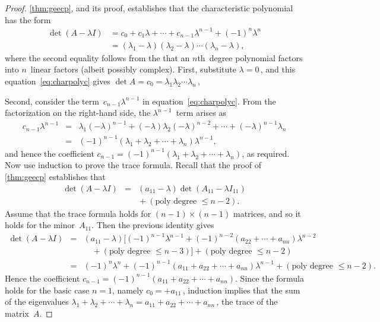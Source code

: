 \begin{proof} 
\cref{thm:geecp}, and its proof, establishes that the characteristic polynomial has the form
\begin{align}
\det(A-\lambda I)&=c_0+c_1\lambda+\cdots+c_{n-1}\lambda^{n-1}+(-1)^n\lambda^n
\nonumber\\&=(\lambda_1-\lambda)(\lambda_2-\lambda)\cdots(\lambda_n-\lambda),
\label{eq:charpolyc}
\end{align}
where the second equality follows from the  that an \(n\)th~degree polynomial factors into \(n\)~linear factors (albeit possibly complex).
First, substitute \(\lambda=0\)\,, and this equation~\eqref{eq:charpolyc} gives \(\det A=c_0=\lambda_1\lambda_2\cdots\lambda_n\)\,, 

Second, consider the term~\(c_{n-1}\lambda^{n-1}\) in equation~\eqref{eq:charpolyc}.
From the factorization on the right-hand side, the \(\lambda^{n-1}\)~term arises as
\begin{eqnarray*}
c_{n-1}\lambda^{n-1}&=&\lambda_1(-\lambda)^{n-1}
+(-\lambda)\lambda_2(-\lambda)^{n-2}
+\cdots+(-\lambda)^{n-1}\lambda_n
\\&=&(-1)^{n-1}(\lambda_1+\lambda_2+\cdots+\lambda_n)\lambda^{n-1},
\end{eqnarray*}
and hence the coefficient \(c_{n-1}=(-1)^{n-1}(\lambda_1+\lambda_2+\cdots+\lambda_n)\), as required.
Now use induction to prove the trace formula.
Recall that the proof of \cref{thm:geecp} establishes that
\begin{eqnarray*}
\det(A-\lambda I)
&=&(a_{11}-\lambda)\det (A_{11}-\lambda I_{11})
\\&&{}
+(\text{poly degree }\leq n-2).
\end{eqnarray*}
Assume that the trace formula holds for \((n-1)\times(n-1)\) matrices, and so it holds for the minor~\(A_{11}\). 
Then the previous identity gives
\begin{eqnarray*}
\det(A-\lambda I)
&=&(a_{11}-\lambda)\big[(-1)^{n-1}\lambda^{n-1}
+(-1)^{n-2}(a_{22}+\cdots+a_{nn})\lambda^{n-2} 
\\&&\quad{}
+(\text{poly degree }\leq n-3)\big]
+(\text{poly degree }\leq n-2)
\\&=&(-1)^{n}\lambda^{n}
+(-1)^{n-1}(a_{11}+a_{22}+\cdots+a_{nn})\lambda^{n-1} 
+(\text{poly degree }\leq n-2).
\end{eqnarray*}
Hence the coefficient \(c_{n-1}=(-1)^{n-1}(a_{11}+a_{22}+\cdots+a_{nn})\).
Since the formula holds for the basic case \(n=1\), namely \(c_0=+a_{11}\)\,, induction implies that the sum of the eigenvalues
\(\lambda_1+\lambda_2+\cdots+\lambda_n=a_{11}+a_{22}+\cdots+a_{nn}\)\,, the trace of the matrix~\(A\).
\end{proof}


